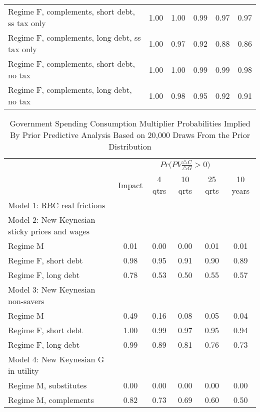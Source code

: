 \documentclass[letterpaper,12pt]{article}%
\begin{document}
\begin{table}[H]
\begin{tabular}{l c c c c c}
     \quad Regime F, complements, short debt, ss tax only &  1.00   &   1.00 & 0.99 & 0.97 & 0.97  \\
     \quad Regime F, complements, long debt, ss tax only &  1.00 & 0.97 &  0.92 &  0.88 & 0.86\\
     \quad Regime F, complements, short debt, no tax &  1.00 & 1.00 &  0.99 & 0.99  & 0.98 \\
     \quad Regime F, complements, long debt, no tax &   1.00 &  0.98  & 0.95  & 0.92 & 0.91  \\
     \midrule
    \bottomrule    
    \end{tabular}
    \label{tab:PPAOutputMultipliers}
\end{table}

\begin{table}[H]
    \centering
     \caption{Government Spending Consumption Multiplier Probabilities Implied By Prior Predictive Analysis Based on 20,000 Draws From the Prior Distribution}
    \begin{tabular}{l c c c c c}
    \toprule
        & \multicolumn{5}{c}{$Pr\Big(PV \frac{\triangle C}{\triangle G}>0\Big)$}\\
        \cmidrule{2-6}
        & Impact & 4 qtrs & 10 qrts & 25 qrts & 10 years \\
        \midrule
     Model 1: RBC real frictions &    &   &   &   &  \\
     Model 2: New Keynesian sticky prices and wages    &    &   &   &   &  \\
     \quad Regime M &   0.01 &  0.00  & 0.00 & 0.01 & 0.01  \\
     \quad Regime F, short debt &  0.98 & 0.95 &  0.91  & 0.90  & 0.89  \\
     \quad Regime F, long debt &  0.78  &  0.53 & 0.50 & 0.55 & 0.57  \\
     Model 3: New Keynesian non-savers &    &   &   &   &  \\
     \quad Regime M &  0.49 &  0.16 & 0.08 & 0.05 & 0.04 \\
     \quad Regime F, short debt &  1.00 & 0.99  & 0.97 &  0.95 &  0.94 \\
     \quad Regime F, long debt &  0.99 &  0.89  & 0.81 & 0.76  & 0.73  \\
     Model 4: New Keynesian G in utility &    &   &   &   &  \\
     \quad Regime M, substitutes &  0.00 &  0.00 & 0.00 & 0.00 & 0.00  \\
     \quad Regime M, complements &   0.82  & 0.73  & 0.69 & 0.60  & 0.50 \\

\end{tabular}
\end{table}
\end{document}
